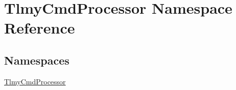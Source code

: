 \hypertarget{namespace_tlmy_cmd_processor}{}\section{Tlmy\+Cmd\+Processor Namespace Reference}
\label{namespace_tlmy_cmd_processor}
\subsection*{Namespaces}
\begin{DoxyCompactItemize}
\item 
 \hyperlink{namespace_tlmy_cmd_processor_1_1_tlmy_cmd_processor}{Tlmy\+Cmd\+Processor}
\end{DoxyCompactItemize}

